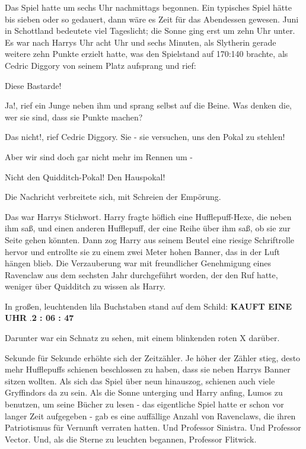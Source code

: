 Das Spiel hatte um sechs Uhr nachmittags begonnen. Ein typisches Spiel hätte bis
sieben oder so gedauert, dann wäre es Zeit für das Abendessen gewesen. Juni in
Schottland bedeutete viel Tageslicht; die Sonne ging erst um zehn Uhr unter. Es
war nach Harrys Uhr acht Uhr und sechs Minuten, als Slytherin gerade weitere
zehn Punkte erzielt hatte, was den Spielstand auf 170:140 brachte, als Cedric
Diggory von seinem Platz aufsprang und rief:

\glqq{}Diese Bastarde!\grqq{}

\glqq{}Ja!\grqq{}, rief ein Junge neben ihm und sprang selbst auf die Beine.
\glqq{}Was denken die, wer sie sind, dass sie Punkte machen?\grqq{}

\glqq{}Das nicht!\grqq{}, rief Cedric Diggory. \glqq{}Sie - sie versuchen, uns den
Pokal zu stehlen!\grqq{}

\glqq{}Aber wir sind doch gar nicht mehr im Rennen um -\grqq{}

\glqq{}Nicht den Quidditch-Pokal! Den Hauspokal!\grqq{}

Die Nachricht verbreitete sich, mit Schreien der Empörung.

Das war Harrys Stichwort. Harry fragte höflich eine Hufflepuff-Hexe, die neben
ihm saß, und einen anderen Hufflepuff, der eine Reihe über ihm saß, ob sie zur
Seite gehen könnten. Dann zog Harry aus seinem Beutel eine riesige Schriftrolle
hervor und entrollte sie zu einem zwei Meter hohen Banner, das in der Luft
hängen blieb. Die Verzauberung war mit freundlicher Genehmigung eines Ravenclaw
aus dem sechsten Jahr durchgeführt worden, der den Ruf hatte, weniger über
Quidditch zu wissen als Harry.

In großen, leuchtenden lila Buchstaben stand auf dem Schild: \textbf{KAUFT EINE
UHR} \grqq{}.\textbf{2 : 06 : 47}

Darunter war ein Schnatz zu sehen, mit einem blinkenden roten X darüber.

Sekunde für Sekunde erhöhte sich der Zeitzähler. Je höher der Zähler stieg,
desto mehr Hufflepuffs schienen beschlossen zu haben, dass sie neben Harrys
Banner sitzen wollten. Als sich das Spiel über neun hinauszog, schienen auch
viele Gryffindors da zu sein. Als die Sonne unterging und Harry anfing, Lumos zu
benutzen, um seine Bücher zu lesen - das eigentliche Spiel hatte er schon vor
langer Zeit aufgegeben - gab es eine auffällige Anzahl von Ravenclaws, die ihren
Patriotismus für Vernunft verraten hatten. Und Professor Sinistra. Und Professor
Vector. Und, als die Sterne zu leuchten begannen, Professor Flitwick.


